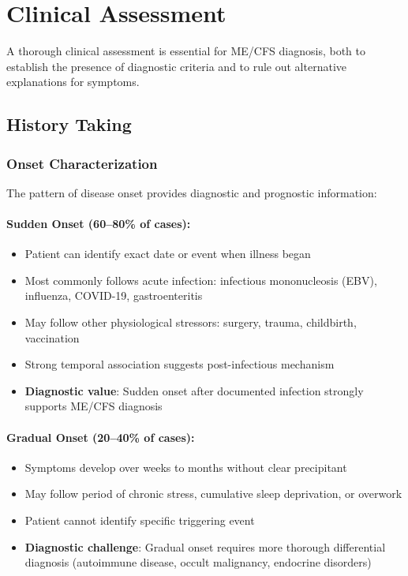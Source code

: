 \section{Clinical Assessment}
\label{sec:assessment}

A thorough clinical assessment is essential for ME/CFS diagnosis, both to establish the presence of diagnostic criteria and to rule out alternative explanations for symptoms.

\subsection{History Taking}

\subsubsection{Onset Characterization}

\begin{observation}
\label{obs:onset-patterns}
The pattern of disease onset provides diagnostic and prognostic information:

\paragraph{Sudden Onset (60--80\% of cases):}
\begin{itemize}
    \item Patient can identify exact date or event when illness began
    \item Most commonly follows acute infection: infectious mononucleosis (EBV), influenza, COVID-19, gastroenteritis
    \item May follow other physiological stressors: surgery, trauma, childbirth, vaccination
    \item Strong temporal association suggests post-infectious mechanism
    \item \textbf{Diagnostic value}: Sudden onset after documented infection strongly supports ME/CFS diagnosis
\end{itemize}

\paragraph{Gradual Onset (20--40\% of cases):}
\begin{itemize}
    \item Symptoms develop over weeks to months without clear precipitant
    \item May follow period of chronic stress, cumulative sleep deprivation, or overwork
    \item Patient cannot identify specific triggering event
    \item \textbf{Diagnostic challenge}: Gradual onset requires more thorough differential diagnosis (autoimmune disease, occult malignancy, endocrine disorders)
\end{itemize}
\end{observation}

